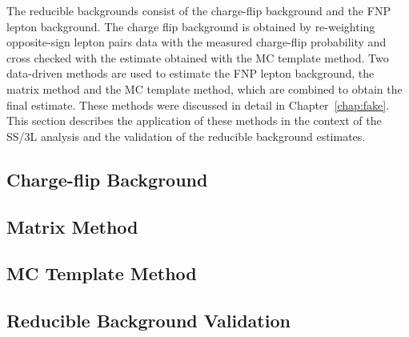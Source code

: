 The reducible backgrounds consist of the charge-flip background and 
the FNP lepton background.
The charge flip background is obtained by re-weighting opposite-sign 
lepton pairs data with the measured charge-flip probability and cross checked 
with the estimate obtained with the MC template method.
Two data-driven methods are used to estimate the FNP lepton background, 
the matrix method and the MC template method,
which are combined to obtain the final estimate.  
These methods were discussed in detail in Chapter~\ref{chap:fake}.
This section describes the application of these methods in the 
context of the SS/3L analysis and the validation of the reducible 
background estimates.

\subsection{Charge-flip Background}\label{sec:bkg.red.chflip}


\subsection{Matrix Method}\label{sec:bkg.red.mxm}


\subsection{MC Template Method}\label{sec:bkg.red.mct}


\subsection{Reducible Background Validation}\label{sec:bkg.red.val}

